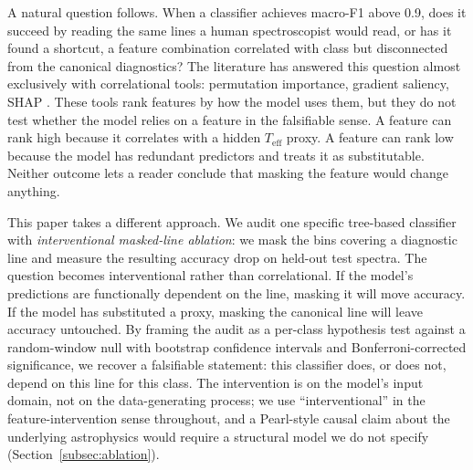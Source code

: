 \documentclass[11pt,a4paper]{article}
\newcommand{\Teff}{$T_{\mathrm{eff}}$\xspace}
\begin{document}
A natural question follows. When a classifier achieves macro-F1 above 0.9, does it succeed by reading the same lines a human spectroscopist would read, or has it found a shortcut, a feature combination correlated with class but disconnected from the canonical diagnostics? The literature has answered this question almost exclusively with correlational tools: permutation importance, gradient saliency, SHAP \citep{LundbergLee2017SHAP}. These tools rank features by how the model uses them, but they do not test whether the model relies on a feature in the falsifiable sense. A feature can rank high because it correlates with a hidden \Teff proxy. A feature can rank low because the model has redundant predictors and treats it as substitutable. Neither outcome lets a reader conclude that masking the feature would change anything.

This paper takes a different approach. We audit one specific tree-based classifier with \emph{interventional masked-line ablation}: we mask the bins covering a diagnostic line and measure the resulting accuracy drop on held-out test spectra. The question becomes interventional rather than correlational. If the model's predictions are functionally dependent on the line, masking it will move accuracy. If the model has substituted a proxy, masking the canonical line will leave accuracy untouched. By framing the audit as a per-class hypothesis test against a random-window null with bootstrap confidence intervals and Bonferroni-corrected significance, we recover a falsifiable statement: this classifier does, or does not, depend on this line for this class. The intervention is on the model's input domain, not on the data-generating process; we use ``interventional'' in the feature-intervention sense throughout, and a Pearl-style causal claim about the underlying astrophysics would require a structural model we do not specify (Section~\ref{subsec:ablation}).
\end{document}
